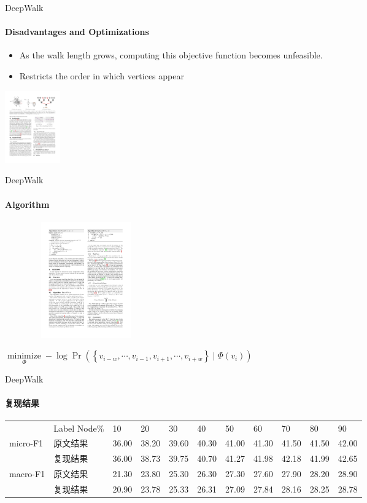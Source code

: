\documentclass{beamer}
\begin{document}
\begin{frame}{DeepWalk}
    \framesubtitle{Disadvantages and Optimizations}
    \begin{itemize}
        \item As the walk length grows, computing this objective function becomes unfeasible.
        \item Restricts the order in which vertices appear
    \end{itemize}
    \centering\includegraphics[height=3.1cm]{DeepWalk_3.pdf}
\end{frame}
\begin{frame}{DeepWalk}
    \framesubtitle{Algorithm}
    \centering\includegraphics[height=5cm, width=7cm]{DeepWalk_4.pdf}
    \begin{corollary}
        $\underset{\Phi}{\operatorname{minimize}}-\log \operatorname{Pr}\left(\left\{v_{i-w}, \cdots, v_{i-1}, v_{i+1}, \cdots, v_{i+w}\right\} \mid \Phi\left(v_{i}\right)\right)$
    \end{corollary}
\end{frame}
\begin{frame}{DeepWalk}
    \framesubtitle{复现结果}
    \begin{table}[]
        \resizebox{\textwidth}{!}
        {
            \begin{tabular}{lllllllllll}
                        & Label Node\% & 10    & 20    & 30    & 40    & 50    & 60    & 70    & 80    & 90    \\
            micro-F1 & 原文结果         & 36.00 & 38.20 & 39.60 & 40.30 & 41.00 & 41.30 & 41.50 & 41.50 & 42.00 \\
                        & 复现结果         & 36.00 & 38.73 & 39.75 & 40.70 & 41.27 & 41.98 & 42.18 & 41.99 & 42.65 \\
            macro-F1 & 原文结果         & 21.30 & 23.80 & 25.30 & 26.30 & 27.30 & 27.60 & 27.90 & 28.20 & 28.90 \\
                        & 复现结果         & 20.90 & 23.78 & 25.33 & 26.31 & 27.09 & 27.84 & 28.16 & 28.25 & 28.78
            \end{tabular}
        }
    \end{table}
\end{frame}
\end{document}
